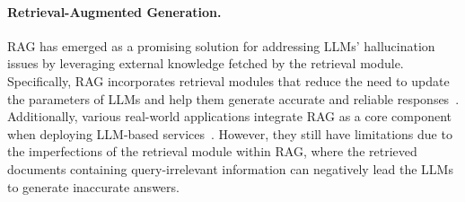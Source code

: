 
\paragraph{Retrieval-Augmented Generation.} RAG has emerged as a promising solution for addressing LLMs' hallucination issues by leveraging external knowledge fetched by the retrieval module. 
Specifically, RAG incorporates retrieval modules that reduce the need to update the parameters of LLMs and help them generate accurate and reliable responses~\cite{DBLP:conf/iclr/KhandelwalLJZL20, RAG, DBLP:conf/icml/BorgeaudMHCRM0L22, replug}. 
Additionally, various real-world applications integrate RAG as a core component when deploying LLM-based services~\cite{plugin, langchain, Toolllm}. %
However, they still have limitations due to the imperfections of the retrieval module within RAG, where the retrieved documents containing query-irrelevant information can negatively lead the LLMs to generate inaccurate answers.


